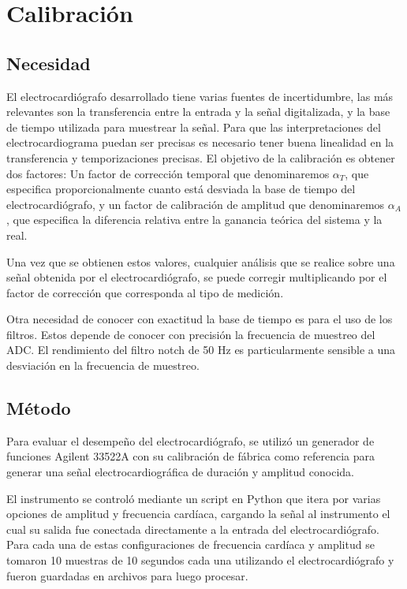 \documentclass[conference]{IEEEtran}
\begin{document}
\section{Calibración}

\subsection{Necesidad}

El electrocardiógrafo desarrollado tiene varias fuentes de incertidumbre, las más
relevantes son la transferencia entre la entrada y la señal digitalizada, y la base
de tiempo utilizada para muestrear la señal. Para que las interpretaciones del
electrocardiograma puedan ser precisas es necesario tener buena linealidad en la 
transferencia y temporizaciones precisas. El objetivo de la calibración es obtener
dos factores: Un factor de corrección temporal que denominaremos $\alpha_T$,
que especifica proporcionalmente cuanto está desviada la base de tiempo del
electrocardiógrafo, y un factor de calibración de amplitud que denominaremos
$\alpha_A$, que especifica la diferencia relativa entre la ganancia teórica del
sistema y la real.

Una vez que se obtienen estos valores, cualquier análisis que se realice sobre
una señal obtenida por el electrocardiógrafo, se puede corregir multiplicando por
el factor de corrección que corresponda al tipo de medición.

Otra necesidad de conocer con exactitud la base de tiempo es para el uso de los
filtros. Estos depende de conocer con precisión la frecuencia de muestreo del ADC.
El rendimiento del filtro notch de 50 Hz es particularmente sensible a una
desviación en la frecuencia de muestreo.


\subsection{Método}


Para evaluar el desempeño del electrocardiógrafo, se utilizó un generador de funciones
Agilent 33522A con su calibración de fábrica como referencia para generar una señal
electrocardiográfica de duración y amplitud conocida.

El instrumento se controló mediante un script en Python que itera por varias
opciones de amplitud y frecuencia cardíaca, cargando la señal al instrumento el cual 
su salida fue conectada directamente a la entrada del electrocardiógrafo. Para cada 
una de estas configuraciones de frecuencia cardíaca y amplitud se tomaron 10
muestras de 10 segundos cada una utilizando el electrocardiógrafo y fueron guardadas
en archivos para luego procesar.
\end{document}
